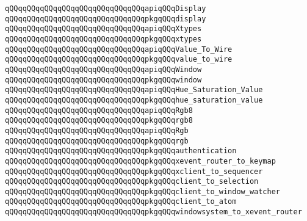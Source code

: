 \newline
\verb|qQQqqQQqqQQqqQQqqQQqqQQqqQQqqQQqapiqQQqDisplay|\newline
\verb|qQQqqQQqqQQqqQQqqQQqqQQqqQQqqQQqpkgqQQqdisplay|\newline
\newline
\verb|qQQqqQQqqQQqqQQqqQQqqQQqqQQqqQQqapiqQQqXtypes|\newline
\verb|qQQqqQQqqQQqqQQqqQQqqQQqqQQqqQQqpkgqQQqxtypes|\newline
\newline
\verb|qQQqqQQqqQQqqQQqqQQqqQQqqQQqqQQqapiqQQqValue_To_Wire|\newline
\verb|qQQqqQQqqQQqqQQqqQQqqQQqqQQqqQQqpkgqQQqvalue_to_wire|\newline
\newline
\verb|qQQqqQQqqQQqqQQqqQQqqQQqqQQqqQQqapiqQQqWindow|\newline
\verb|qQQqqQQqqQQqqQQqqQQqqQQqqQQqqQQqpkgqQQqwindow|\newline
\newline
\verb|qQQqqQQqqQQqqQQqqQQqqQQqqQQqqQQqapiqQQqHue_Saturation_Value|\newline
\verb|qQQqqQQqqQQqqQQqqQQqqQQqqQQqqQQqpkgqQQqhue_saturation_value|\newline
\newline
\verb|qQQqqQQqqQQqqQQqqQQqqQQqqQQqqQQqapiqQQqRgb8|\newline
\verb|qQQqqQQqqQQqqQQqqQQqqQQqqQQqqQQqpkgqQQqrgb8|\newline
\newline
\verb|qQQqqQQqqQQqqQQqqQQqqQQqqQQqqQQqapiqQQqRgb|\newline
\verb|qQQqqQQqqQQqqQQqqQQqqQQqqQQqqQQqpkgqQQqrgb|\newline
\newline
\verb|qQQqqQQqqQQqqQQqqQQqqQQqqQQqqQQqpkgqQQqauthentication|\newline
\newline
\verb|qQQqqQQqqQQqqQQqqQQqqQQqqQQqqQQqpkgqQQqxevent_router_to_keymap|\newline
\verb|qQQqqQQqqQQqqQQqqQQqqQQqqQQqqQQqpkgqQQqxclient_to_sequencer|\newline
\verb|qQQqqQQqqQQqqQQqqQQqqQQqqQQqqQQqpkgqQQqclient_to_selection|\newline
\verb|qQQqqQQqqQQqqQQqqQQqqQQqqQQqqQQqpkgqQQqclient_to_window_watcher|\newline
\verb|qQQqqQQqqQQqqQQqqQQqqQQqqQQqqQQqpkgqQQqclient_to_atom|\newline
\verb|qQQqqQQqqQQqqQQqqQQqqQQqqQQqqQQqpkgqQQqwindowsystem_to_xevent_router|\newline
